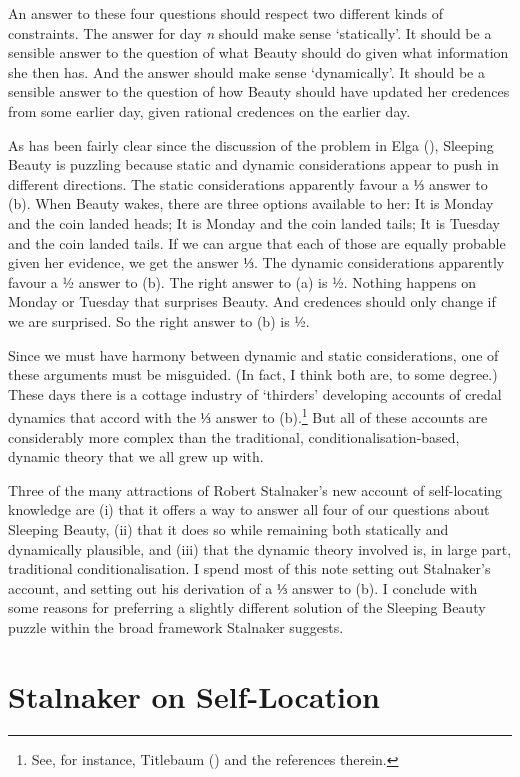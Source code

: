 \documentclass[
  11pt,
  letterpaper,
  DIV=11,
  numbers=noendperiod,
  twoside]{scrartcl}
\begin{document}
An answer to these four questions should respect two different kinds of
constraints. The answer for day \emph{n} should make sense `statically'.
It should be a sensible answer to the question of what Beauty should do
given what information she then has. And the answer should make sense
`dynamically'. It should be a sensible answer to the question of how
Beauty should have updated her credences from some earlier day, given
rational credences on the earlier day.

As has been fairly clear since the discussion of the problem in Elga
(), Sleeping Beauty is puzzling because
static and dynamic considerations appear to push in different
directions. The static considerations apparently favour a ⅓ answer to
(b). When Beauty wakes, there are three options available to her: It is
Monday and the coin landed heads; It is Monday and the coin landed
tails; It is Tuesday and the coin landed tails. If we can argue that
each of those are equally probable given her evidence, we get the answer
⅓. The dynamic considerations apparently favour a ½ answer to (b). The
right answer to (a) is ½. Nothing happens on Monday or Tuesday that
surprises Beauty. And credences should only change if we are surprised.
So the right answer to (b) is ½.

Since we must have harmony between dynamic and static considerations,
one of these arguments must be misguided. (In fact, I think both are, to
some degree.) These days there is a cottage industry of `thirders'
developing accounts of credal dynamics that accord with the ⅓ answer to
(b).\footnote{See, for instance, Titlebaum
  () and the references therein.} But
all of these accounts are considerably more complex than the
traditional, conditionalisation-based, dynamic theory that we all grew
up with.

Three of the many attractions of Robert Stalnaker's new account of
self-locating knowledge are (i) that it offers a way to answer all four
of our questions about Sleeping Beauty, (ii) that it does so while
remaining both statically and dynamically plausible, and (iii) that the
dynamic theory involved is, in large part, traditional
conditionalisation. I spend most of this note setting out Stalnaker's
account, and setting out his derivation of a ⅓ answer to (b). I conclude
with some reasons for preferring a slightly different solution of the
Sleeping Beauty puzzle within the broad framework Stalnaker suggests.

\section{Stalnaker on Self-Location}\label{stalnaker-on-self-location}
\end{document}
